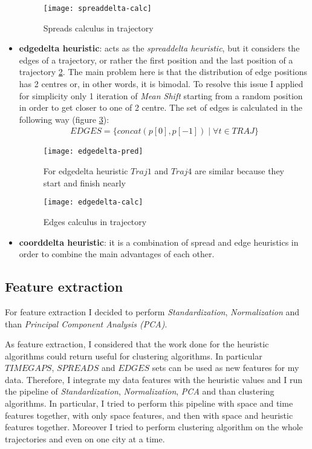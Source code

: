 \begin{itemize}
	\begin{figure}[bt]
		\centering
		\texttt{[image: spreaddelta-calc]}
		\caption{Spreads calculus in trajectory}
		\label{fig:spreaddelta-calc}
	\end{figure}
	
	\item \textbf{edgedelta heuristic}: acts as the \textit{spreaddelta heuristic}, but it considers the edges of a trajectory, or rather the first position and the last position of a trajectory \ref{fig:edgedelta-pred}. The main problem here is that the distribution of edge positions has 2 centres or, in other words, it is bimodal. To resolve this issue I applied for simplicity only 1 iteration of \textit{Mean Shift} starting from a random position in order to get closer to one of 2 centre. The set of edges is calculated in the following way (figure \ref{fig:edgedelta-calc}): 
	\begin{align}
		EDGES = \{concat(p[0], p[-1]) \mid \forall t \in TRAJ \}
	\end{align}
	
	\begin{figure}[bt]
		\centering
		\texttt{[image: edgedelta-pred]}
		\caption{For edgedelta heuristic $Traj1$ and $Traj4$ are similar because they start and finish nearly}
		\label{fig:edgedelta-pred}
	\end{figure}
	
	\begin{figure}[bt]
		\centering
		\texttt{[image: edgedelta-calc]}
		\caption{Edges calculus in trajectory}
		\label{fig:edgedelta-calc}
	\end{figure}

	\item \textbf{coorddelta heuristic}: it is a combination of spread and edge heuristics in order to combine the main advantages of each other. 
\end{itemize}

\subsection{Feature extraction}

For feature extraction I decided to perform \textit{Standardization}, \textit{Normalization} and than \textit{Principal Component Analysis (PCA)}.

As feature extraction, I considered that the work done for the heuristic algorithms could return useful for clustering algorithms. In particular $TIMEGAPS$, $SPREADS$ and $EDGES$ sets can be used as new features for my data. Therefore, I integrate my data features with the heuristic values and I run the pipeline of \textit{Standardization}, \textit{Normalization}, \textit{PCA} and than clustering algorithms. In particular, I tried to perform this pipeline with space and time features together, with only space features, and then with space and heuristic features together. Moreover I tried to perform clustering algorithm on the whole trajectories and even on one city at a time.

